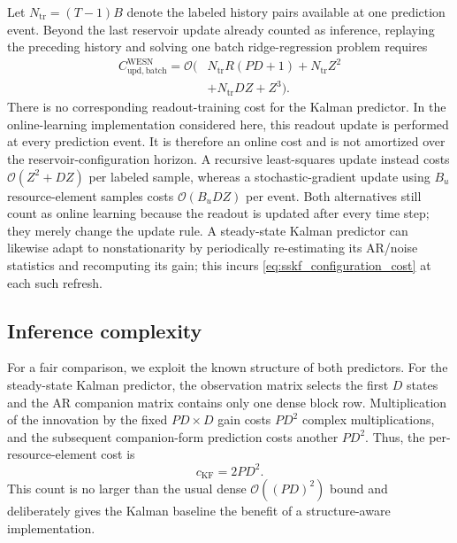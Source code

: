 \documentclass[lettersize,journal]{IEEEtran}
\begin{document}
Let $N_{\mathrm{tr}}=(T-1)B$ denote the labeled history pairs available at one
prediction event.  Beyond the last reservoir update already counted as
inference, replaying the preceding history and solving one batch
ridge-regression problem requires
\begin{equation}
\begin{aligned}
 C_{\mathrm{upd,batch}}^{\mathrm{WESN}}
 =\mathcal{O}\!\big(&N_{\mathrm{tr}}R(PD+1)
 +N_{\mathrm{tr}}Z^2 \\
 &+N_{\mathrm{tr}}DZ+Z^3\big).
 \label{eq:wesn_online_batch_cost}
\end{aligned}
\end{equation}
There is no corresponding readout-training cost for the Kalman predictor.
In the online-learning implementation considered here, this readout update is
performed at every prediction event.  It is therefore an online cost and is
not amortized over the reservoir-configuration horizon.  A recursive
least-squares update instead costs $\mathcal{O}(Z^2+DZ)$ per labeled sample,
whereas a stochastic-gradient update using $B_u$ resource-element samples
costs $\mathcal{O}(B_uDZ)$ per event.  Both alternatives still count as online
learning because the readout is updated after every time step; they merely
change the update rule.  A steady-state Kalman predictor can likewise adapt to
nonstationarity by periodically re-estimating its AR/noise statistics and
recomputing its gain; this incurs
\eqref{eq:sskf_configuration_cost} at each such refresh.

\subsection{Inference complexity}

For a fair comparison, we exploit the known structure of both predictors.
For the steady-state Kalman predictor, the observation matrix selects the
first $D$ states and the AR companion matrix contains only one dense block
row.  Multiplication of the innovation by the fixed $PD\times D$ gain costs
$PD^2$ complex multiplications, and the subsequent companion-form prediction
costs another $PD^2$.  Thus, the per-resource-element cost is
\begin{equation}
 c_{\mathrm{KF}}=2PD^2.
 \label{eq:sskf_inference_cost}
\end{equation}
This count is no larger than the usual dense
$\mathcal{O}((PD)^2)$ bound and deliberately gives the Kalman baseline the
benefit of a structure-aware implementation.
\end{document}
